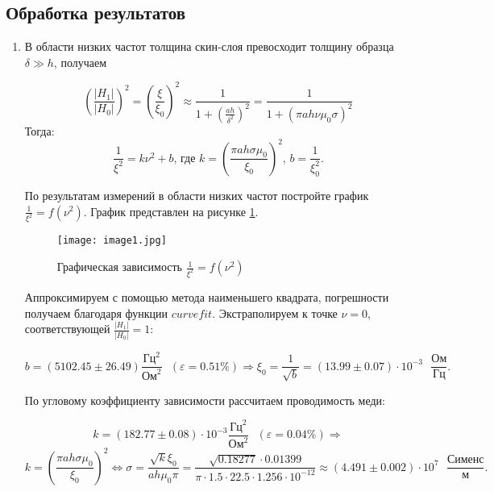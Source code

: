 \documentclass[a4paper,12pt]{article} %
\begin{document}
\newpage

\subsection{Обработка результатов}

\begin{enumerate}
        \item В области низких частот толщина скин-слоя превосходит толщину образца $ \delta \gg h$, получаем
	
        \[ \left(\frac{|H_1|}{|H_0|}\right)^2 = \left(\frac{\xi}{\xi_0}\right)^2 \approx \frac{1}{1+\left(\frac{ah}{\delta^2}\right)^2} = \frac{1}{1 + \left(\pi ah\nu\mu_0\sigma\right)^2} \]
	Тогда: 
	\begin{equation*}
		\frac{1}{\xi^2}=k\nu^2 + b \text{, где } k=\left(\frac{\pi a h \sigma \mu_0}{\xi_0}\right)^2\text{, } b = \frac{1}{\xi_0^2}.
	\end{equation*}
 
    По результатам измерений в области низких частот  постройте график $\frac{1}{\xi^2}=f(\nu^2)$. График представлен на рисунке \ref{graf1}.

    \begin{figure}[h]
        \centering
        \texttt{[image: image1.jpg]}
        \caption{Графическая зависимость $\frac{1}{\xi^2}=f(\nu^2)$}
        \label{graf1}
    \end{figure}

    Аппроксимируем с помощью метода наименьшего квадрата, погрешности получаем благодаря функции $curvefit$. Экстраполируем к точке $\nu = 0$, соответствующей $\frac{|H_1|}{|H_0|} = 1$:

    \[ b = (5102.45 \pm 26.49) \frac{\text{Гц}^2}{\text{Ом}^2} \text{ }(\varepsilon = 0.51 \%)\Longrightarrow \xi_0 = \frac{1}{\sqrt{b}} = (13.99 \pm 0.07) \cdot 10^{-3} \text{ } \frac{\text{Ом}}{\text{Гц}}.
    \]

    По угловому коэффициенту зависимости рассчитаем проводимость меди:

    \[ k = (182.77 \pm 0.08) \cdot 10^{-3} \frac{\text{Гц}^2}{\text{Ом}^2} \text{ }(\varepsilon = 0.04 \%)\Longrightarrow \] \[ k=\left(\frac{\pi a h \sigma \mu_0}{\xi_0}\right)^2 \Leftrightarrow \sigma = \frac{\sqrt{k}\xi_0}{ah\mu_0\pi} = \frac{\sqrt{0.18277} \cdot 0.01399}{\pi\cdot1.5\cdot22.5\cdot1.256 \cdot10^{-12}} \approx (4.491 \pm 0.002 )\cdot 10^7 \text{ }\frac{\text{Сименс}}{\text{м}}. \]

\newpage


\end{enumerate}
\end{document}
